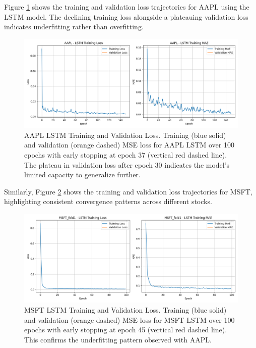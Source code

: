 \documentclass[sigconf]{acmart}
\begin{document}
Figure \ref{fig:aapl_loss} shows the training and validation loss trajectories for AAPL using the LSTM model. The declining training loss alongside a plateauing validation loss indicates underfitting rather than overfitting.

\begin{figure}[h]
\centering
\includegraphics[width=\linewidth]{AAPL_lstm_loss_curve_20250429_124312.png}
\caption{AAPL LSTM Training and Validation Loss. Training (blue solid) and validation (orange dashed) MSE loss for AAPL LSTM over 100 epochs with early stopping at epoch 37 (vertical red dashed line). The plateau in validation loss after epoch 30 indicates the model's limited capacity to generalize further.}
\label{fig:aapl_loss}
\end{figure}

Similarly, Figure \ref{fig:msft_loss} shows the training and validation loss trajectories for MSFT, highlighting consistent convergence patterns across different stocks.

\begin{figure}[h]
\centering
\includegraphics[width=\linewidth]{MSFT_fold1_lstm_loss_curve_20250429_170349.png}
\caption{MSFT LSTM Training and Validation Loss. Training (blue solid) and validation (orange dashed) MSE loss for MSFT LSTM over 100 epochs with early stopping at epoch 45 (vertical red dashed line). This confirms the underfitting pattern observed with AAPL.}
\label{fig:msft_loss}
\end{figure}
\end{document}
